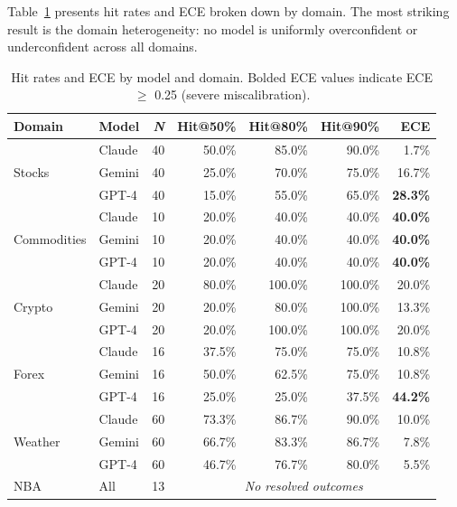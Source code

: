 \documentclass[9pt,twoside,lineno]{pnas-new}
\begin{document}
Table~\ref{tab:domain} presents hit rates and ECE broken down by domain. The most striking result is the domain heterogeneity: no model is uniformly overconfident or underconfident across all domains.

\begin{table}[h]
\centering
\caption{Hit rates and ECE by model and domain. Bolded ECE values indicate ECE $\geq$ 0.25 (severe miscalibration).}
\label{tab:domain}
\begin{tabular}{llrrrrr}
\hline
\textbf{Domain} & \textbf{Model} & \textbf{\textit{N}} & \textbf{Hit@50\%} & \textbf{Hit@80\%} & \textbf{Hit@90\%} & \textbf{ECE} \\
\hline
\multirow{3}{*}{Stocks} & Claude & 40 & 50.0\% & 85.0\% & 90.0\% & 1.7\% \\
                         & Gemini & 40 & 25.0\% & 70.0\% & 75.0\% & 16.7\% \\
                         & GPT-4  & 40 & 15.0\% & 55.0\% & 65.0\% & \textbf{28.3\%} \\
\hline
\multirow{3}{*}{Commodities} & Claude & 10 & 20.0\% & 40.0\% & 40.0\% & \textbf{40.0\%} \\
                              & Gemini & 10 & 20.0\% & 40.0\% & 40.0\% & \textbf{40.0\%} \\
                              & GPT-4  & 10 & 20.0\% & 40.0\% & 40.0\% & \textbf{40.0\%} \\
\hline
\multirow{3}{*}{Crypto} & Claude & 20 & 80.0\% & 100.0\% & 100.0\% & 20.0\% \\
                         & Gemini & 20 & 20.0\% & 80.0\% & 100.0\% & 13.3\% \\
                         & GPT-4  & 20 & 20.0\% & 100.0\% & 100.0\% & 20.0\% \\
\hline
\multirow{3}{*}{Forex} & Claude & 16 & 37.5\% & 75.0\% & 75.0\% & 10.8\% \\
                        & Gemini & 16 & 50.0\% & 62.5\% & 75.0\% & 10.8\% \\
                        & GPT-4  & 16 & 25.0\% & 25.0\% & 37.5\% & \textbf{44.2\%} \\
\hline
\multirow{3}{*}{Weather} & Claude & 60 & 73.3\% & 86.7\% & 90.0\% & 10.0\% \\
                          & Gemini & 60 & 66.7\% & 83.3\% & 86.7\% & 7.8\% \\
                          & GPT-4  & 60 & 46.7\% & 76.7\% & 80.0\% & 5.5\% \\
\hline
NBA & All & 13 & \multicolumn{4}{c}{\textit{No resolved outcomes}} \\
\hline
\end{tabular}
\end{table}
\end{document}
